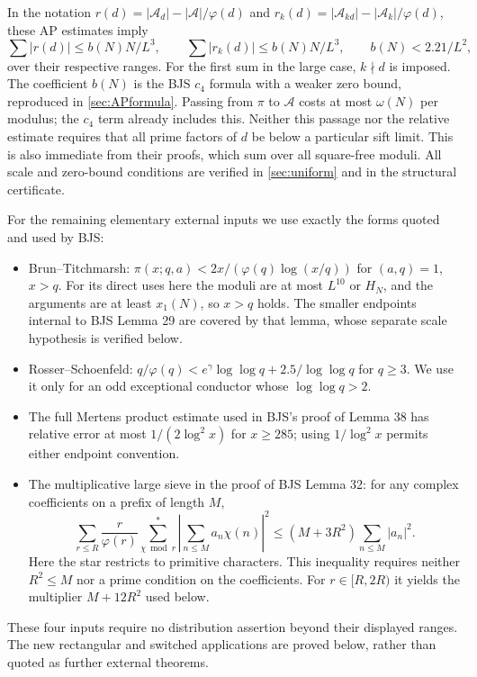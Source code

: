 \documentclass[11pt]{article}
\theoremstyle{definition}
\newcommand{\A}{\mathcal A}
\begin{document}
In the notation $r(d)=|\A_d|-|\A|/\varphi(d)$ and
$r_k(d)=|\A_{kd}|-|\A_k|/\varphi(d)$, these AP estimates imply
\begin{equation}\label{eq:AP}
 \sum |r(d)|\le b(N)N/L^3,\qquad
 \sum |r_k(d)|\le b(N)N/L^3,\qquad b(N)<2.21/L^2,
\end{equation}
over their respective ranges.  For the first sum in the large case,
$k\nmid d$ is imposed.  The coefficient $b(N)$ is the BJS $c_4$ formula
with a weaker zero bound, reproduced in \cref{sec:APformula}.  Passing
from $\pi$ to $\A$ costs at most $\omega(N)$ per modulus; the
$c_4$ term already includes this.  Neither this passage nor the relative
estimate requires that all prime factors of $d$ be below a particular
sift limit.  This is also immediate from their proofs, which sum over
all square-free moduli.  All scale and zero-bound conditions are verified
in \cref{sec:uniform} and in the structural certificate.

For the remaining elementary external inputs we use exactly the forms
quoted and used by BJS:
\begin{itemize}
\item Brun--Titchmarsh:
$\pi(x;q,a)<2x/(\varphi(q)\log(x/q))$ for $(a,q)=1$, $x>q$.
For its direct uses here the moduli are at most $L^{10}$ or $H_N$,
and the arguments are at least $x_1(N)$, so $x>q$ holds.
The smaller endpoints internal to BJS Lemma 29 are covered by that
lemma, whose separate scale hypothesis is verified below.
\item Rosser--Schoenfeld:
$q/\varphi(q)<e^\gamma\log\log q+2.5/\log\log q$ for $q\ge3$.
We use it only for an odd exceptional conductor whose
$\log\log q>2$.
\item The full Mertens product estimate used in BJS's proof of
Lemma 38 has relative error at most $1/(2\log^2x)$ for $x\ge285$;
using $1/\log^2x$ permits either endpoint convention.
\item The multiplicative large sieve in the proof of BJS Lemma 32:
for any complex coefficients on a prefix of length $M$,
\[
 \sum_{r\le R}\frac r{\varphi(r)}
       \sum_{\chi\bmod r}^{*}\left|\sum_{n\le M}a_n\chi(n)\right|^2
 \le (M+3R^2)\sum_{n\le M}|a_n|^2 .
\]
Here the star restricts to primitive characters.  This inequality
requires neither $R^2\le M$ nor a prime condition on the coefficients.
For $r\in[R,2R)$ it yields the multiplier $M+12R^2$ used below.
\end{itemize}
These four inputs require no distribution assertion beyond their
displayed ranges.  The new rectangular and switched applications are
proved below, rather than quoted as further external theorems.
\end{document}

